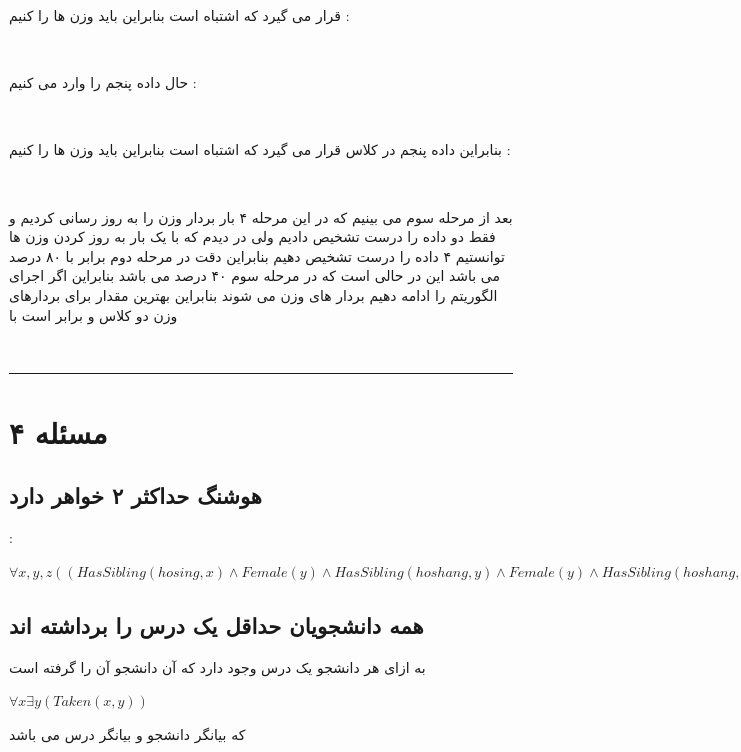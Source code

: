 \documentclass{article}
\begin{document}
قرار می گیرد که اشتباه است بنابراین باید وزن ها را 
کنیم  : 
\begin{center}
	\\
\end{center}
حال داده پنجم را وارد می کنیم  : 
\begin{center}
	\\
\end{center}
بنابراین داده پنجم در کلاس 
قرار می گیرد که اشتباه است بنابراین باید وزن ها را 
کنیم  : 
\begin{center}
	\\
\end{center}
بعد از مرحله سوم می بینیم که در این مرحله ۴ بار بردار وزن را به روز رسانی کردیم و فقط دو داده را درست تشخیص دادیم  
ولی در 
دیدم که با یک بار به روز کردن وزن ها توانستیم ۴ داده را درست تشخیص دهیم بنابراین دقت در مرحله دوم برابر با ۸۰ درصد می باشد این  در حالی است که در مرحله سوم ۴۰ درصد می باشد بنابراین اگر اجرای الگوریتم را ادامه دهیم بردار های وزن 
می شوند بنابراین بهترین مقدار برای بردارهای وزن دو کلاس 
و
برابر است با 
\begin{center}
\\
\end{center}
\hrule
\section*{مسئله ۴}
\subsection*{هوشنگ حداکثر ۲ خواهر دارد  } : 
\begin{center}
	$\forall x , y , z ((HasSibling(hosing , x) \land Female(y) \land HasSibling (hoshang , y) \land Female(y) \land HasSibling(hoshang , z ) \land Female(z)) \Rightarrow (x=y \lor y=z \lor y=z)) $
\end{center}
\subsection*{همه دانشجویان حداقل یک درس را برداشته اند}
به ازای هر دانشجو یک درس وجود دارد که آن دانشجو آن را گرفته است 
\begin{center}
	$\forall x \exists y(Taken(x,y))$
\end{center}
که 
بیانگر دانشجو و 
بیانگر درس می باشد 
\end{document}
